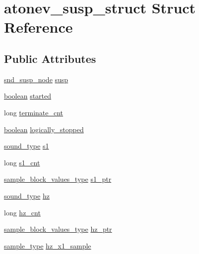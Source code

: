 \hypertarget{structatonev__susp__struct}{}\section{atonev\+\_\+susp\+\_\+struct Struct Reference}
\label{structatonev__susp__struct}
\subsection*{Public Attributes}
\begin{DoxyCompactItemize}
\item 
\hyperlink{sound_8h_a6b268203688a934bd798ceb55f85d4c0}{snd\+\_\+susp\+\_\+node} \hyperlink{structatonev__susp__struct_aa9e4585a8398f280b3e340e679cf6c36}{susp}
\item 
\hyperlink{cext_8h_a7670a4e8a07d9ebb00411948b0bbf86d}{boolean} \hyperlink{structatonev__susp__struct_ad9d68f55b2c73326e09aa76254849733}{started}
\item 
long \hyperlink{structatonev__susp__struct_a788f31e841f41a12d664104329ceadb0}{terminate\+\_\+cnt}
\item 
\hyperlink{cext_8h_a7670a4e8a07d9ebb00411948b0bbf86d}{boolean} \hyperlink{structatonev__susp__struct_a49624b6706b19b1c6d779783f0c89838}{logically\+\_\+stopped}
\item 
\hyperlink{sound_8h_a792cec4ed9d6d636d342d9365ba265ea}{sound\+\_\+type} \hyperlink{structatonev__susp__struct_a9479b5d4cc27f29a4ffeeb42fb7bc897}{s1}
\item 
long \hyperlink{structatonev__susp__struct_ac68de00912f7708b31b5a465c865c2bb}{s1\+\_\+cnt}
\item 
\hyperlink{sound_8h_a83d17f7b465d1591f27cd28fc5eb8a03}{sample\+\_\+block\+\_\+values\+\_\+type} \hyperlink{structatonev__susp__struct_a5bfe65a0af9ae16e272c0719a6c32a15}{s1\+\_\+ptr}
\item 
\hyperlink{sound_8h_a792cec4ed9d6d636d342d9365ba265ea}{sound\+\_\+type} \hyperlink{structatonev__susp__struct_a64e21eb71e0a79cd37b05f20cb5a9028}{hz}
\item 
long \hyperlink{structatonev__susp__struct_a944e692b3606d40be7a83371baaaecfb}{hz\+\_\+cnt}
\item 
\hyperlink{sound_8h_a83d17f7b465d1591f27cd28fc5eb8a03}{sample\+\_\+block\+\_\+values\+\_\+type} \hyperlink{structatonev__susp__struct_a24efc247b41da99c238b92bf9270e10a}{hz\+\_\+ptr}
\item 
\hyperlink{sound_8h_a3a9d1d4a1c153390d2401a6e9f71b32c}{sample\+\_\+type} \hyperlink{structatonev__susp__struct_a974a40326f344cc96b6b6173a8946b71}{hz\+\_\+x1\+\_\+sample}

\end{DoxyCompactItemize}
